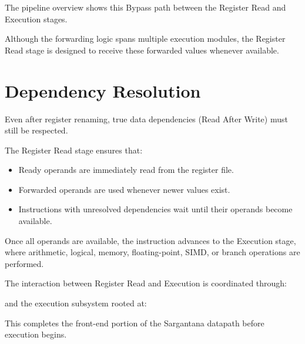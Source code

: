 The pipeline overview shows this Bypass path between the Register Read and Execution
stages.

Although the forwarding logic spans multiple execution modules, the Register Read stage is
designed to receive these forwarded values whenever available.

\section{Dependency Resolution}

Even after register renaming, true data dependencies (Read After Write) must still be respected.

The Register Read stage ensures that:
\begin{itemize}
  \item Ready operands are immediately read from the register file.
  \item Forwarded operands are used whenever newer values exist.
  \item Instructions with unresolved dependencies wait until their operands become available.
\end{itemize}

Once all operands are available, the instruction advances to the Execution stage, where
arithmetic, logical, memory, floating-point, SIMD, or branch operations are performed.

The interaction between Register Read and Execution is coordinated through:

\begin{center}
\end{center}

and the execution subsystem rooted at:

\begin{center}
\end{center}

This completes the front-end portion of the Sargantana datapath before execution begins.
